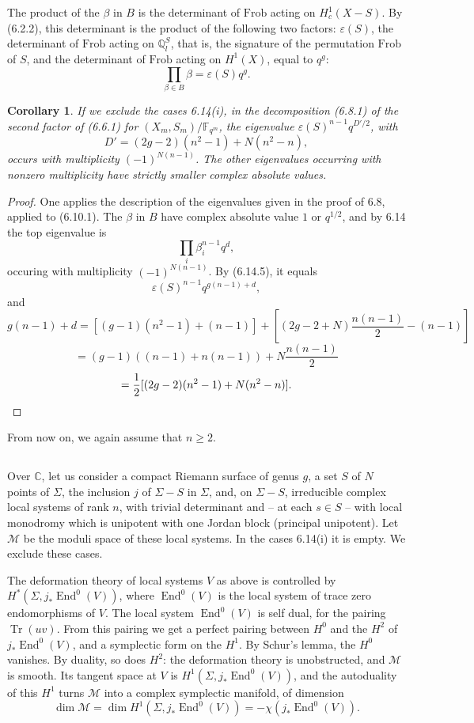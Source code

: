 \documentclass[11pt,a4paper]{article}
\theoremstyle{plain}
\newtheorem{corollary}[theorem]{Corollary}
\theoremstyle{definition}
\DeclareMathOperator{\End}{End}
\DeclareMathOperator{\Tr}{Tr}
\newcommand{\F}{\mathbb{F}}
\newcommand{\Q}{\mathbb{Q}}
\newcommand{\C}{\mathbb{C}}
\newcommand{\Frob}{\mathrm{Frob}}
\begin{document}
The product of the $\beta$ in $B$ is the determinant of $\Frob$ acting on $H_c^1(X - S)$. By (6.2.2), this determinant is the product of the following two factors: $\varepsilon(S)$, the determinant of $\Frob$ acting on $\Q_l^S$, that is, the signature of the permutation $\Frob$ of $S$, and the determinant of $\Frob$ acting on $H^1(X)$, equal to $q^g$:
\begin{equation}
\prod_{\beta \in B} \beta = \varepsilon(S) q^g. \tag{6.14.5}
\end{equation}

\begin{corollary}
If we exclude the cases 6.14(i), in the decomposition (6.8.1) of the second factor of (6.6.1) for $(X_m, S_m)/\F_{q^m}$, the eigenvalue $\varepsilon(S)^{n-1} q^{D'/2}$, with
\[
D' = (2g - 2)(n^2 - 1) + N(n^2 - n),
\]
occurs with multiplicity $(-1)^{N(n-1)}$. The other eigenvalues occurring with nonzero multiplicity have strictly smaller complex absolute values.
\end{corollary}

\begin{proof}
One applies the description of the eigenvalues given in the proof of 6.8, applied to (6.10.1). The $\beta$ in $B$ have complex absolute value $1$ or $q^{1/2}$, and by 6.14 the top eigenvalue is
\[
\prod_i \beta_i^{n-1} q^d,
\]
occuring with multiplicity $(-1)^{N(n-1)}$. By (6.14.5), it equals
\[
\varepsilon(S)^{n-1} q^{g(n-1) + d},
\]
and
\[
g(n-1) + d = [(g-1)(n^2-1) + (n-1)] + [(2g - 2 + N) \frac{n(n-1)}{2} - (n-1)]
\]
\[
= (g-1)((n-1) + n(n-1)) + N \frac{n(n-1)}{2}
\]
\[
= \frac{1}{2}[(2g - 2)(n^2 - 1) + N(n^2 - n)]. \qedhere
\]
\end{proof}

From now on, we again assume that $n \geq 2$.

\subsection{}
Over $\C$, let us consider a compact Riemann surface of genus $g$, a set $S$ of $N$ points of $\Sigma$, the inclusion $j$ of $\Sigma - S$ in $\Sigma$, and, on $\Sigma - S$, irreducible complex local systems of rank $n$, with trivial determinant and -- at each $s \in S$ -- with local monodromy which is unipotent with one Jordan block (principal unipotent). Let $\mathcal{M}$ be the moduli space of these local systems. In the cases 6.14(i) it is empty. We exclude these cases.

The deformation theory of local systems $V$ as above is controlled by $H^*(\Sigma, j_* \End^0(V))$, where $\End^0(V)$ is the local system of trace zero endomorphisms of $V$. The local system $\End^0(V)$ is self dual, for the pairing $\Tr(uv)$. From this pairing we get a perfect pairing between $H^0$ and the $H^2$ of $j_* \End^0(V)$, and a symplectic form on the $H^1$. By Schur's lemma, the $H^0$ vanishes. By duality, so does $H^2$: the deformation theory is unobstructed, and $\mathcal{M}$ is smooth. Its tangent space at $V$ is $H^1(\Sigma, j_* \End^0(V))$, and the autoduality of this $H^1$ turns $\mathcal{M}$ into a complex symplectic manifold, of dimension
\[
\dim \mathcal{M} = \dim H^1(\Sigma, j_* \End^0(V)) = -\chi(j_* \End^0(V)).
\]
\end{document}
